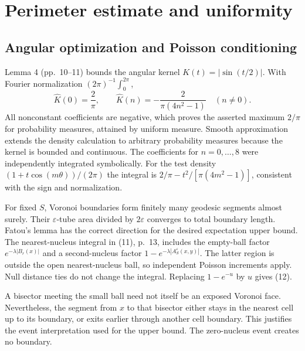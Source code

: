 \documentclass[10pt]{article}
\begin{document}
\section*{Perimeter estimate and uniformity}
\subsection*{Angular optimization and Poisson conditioning}
Lemma 4 (pp. 10–11) bounds the angular kernel \(K(t)=|\sin(t/2)|\). With Fourier normalization \((2\pi)^{-1}\int_0^{2\pi}\), \[\widehat K(0)=\frac2\pi,\qquad
 \widehat K(n)=-\frac{2}{\pi(4n^2-1)}\quad(n\ne0).\] All nonconstant coefficients are negative, which proves the asserted maximum \(2/\pi\) for probability measures, attained by uniform measure. Smooth approximation extends the density calculation to arbitrary probability measures because the kernel is bounded and continuous. The coefficients for \(n=0,\ldots,8\) were independently integrated symbolically. For the test density \((1+t\cos(m\theta))/(2\pi)\) the integral is \(2/\pi-t^2/[\pi(4m^2-1)]\), consistent with the sign and normalization.\par
For fixed \(S\), Voronoi boundaries form finitely many geodesic segments almost surely. Their \(\varepsilon\)-tube area divided by \(2\varepsilon\) converges to total boundary length. Fatou’s lemma has the correct direction for the desired expectation upper bound. The nearest-nucleus integral in (11), p. 13, includes the empty-ball factor \(e^{-\lambda|B_r(x)|}\) and a second-nucleus factor \(1-e^{-\lambda|A^\varepsilon_S(x,y)|}\). The latter region is outside the open nearest-nucleus ball, so independent Poisson increments apply. Null distance ties do not change the integral. Replacing \(1-e^{-u}\) by \(u\) gives (12).\par
A bisector meeting the small ball need not itself be an exposed Voronoi face. Nevertheless, the segment from \(x\) to that bisector either stays in the nearest cell up to its boundary, or exits earlier through another cell boundary. This justifies the event interpretation used for the upper bound. The zero-nucleus event creates no boundary.\par
\end{document}
